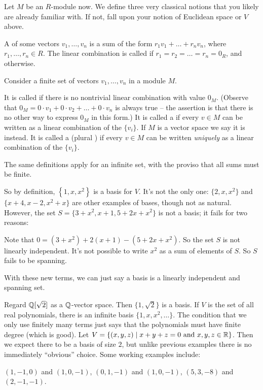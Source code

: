 Let $M$ be an $R$-module now.
We define three very classical notions that you likely are already familiar with.
If not, fall upon your notion of Euclidean space or $V$ above.
\begin{definition}
	A  of some vectors $v_1, \dots, v_n$
	is a sum of the form $r_1 v_1 + \dots + r_n v_n$,
	where $r_1, \dots, r_n \in R$.
	The linear combination is called 
	if $r_1 = r_2 = \dots = r_n = 0_R$, and  otherwise.
\end{definition}
\begin{definition}
	Consider a finite set of vectors $v_1, \dots, v_n$ in a module $M$.
	\begin{itemize}
		\ii It is called  if there
		is no nontrivial linear combination with value $0_M$.
		(Observe that $0_M = 0 \cdot v_1 + 0 \cdot v_2 + \dots + 0 \cdot v_n$
		is always true -- the assertion is that there is no other
		way to express $0_M$ in this form.)
		\ii It is called a  if every $v \in M$ can be written as
		a linear combination of the $\{v_i\}$.
		If $M$ is a vector space we say it is  instead.
		\ii It is called a  (plural )
		if every $v \in M$ can be written
		\emph{uniquely} as a linear combination of the $\{v_i\}$.
	\end{itemize}
	The same definitions apply for an infinite set, with the proviso
	that all sums must be finite.

\end{definition}
So by definition, $\left\{ 1,x,x^2 \right\}$ is a basis for $V$.
It's not the only one: $\{2, x, x^2\}$ and $\{x+4, x-2, x^2+x\}$
are other examples of bases, though not as natural.
However, the set $S = \{3+x^2, x+1, 5+2x+x^2\}$ is not a basis;
it fails for two reasons:
\begin{itemize}
	\ii Note that
	$0 = (3+x^2) + 2(x+1) - (5+2x+x^2)$.
	So the set $S$ is not linearly independent.
	\ii It's not possible to write $x^2$ as a sum of elements of $S$.
	So $S$ fails to be spanning.
\end{itemize}
With these new terms, we can just say a basis is a linearly independent and spanning set.

\begin{example}
	\listhack
	\begin{enumerate}[(a)]
		\ii Regard $\mathbb Q[\sqrt2]$ as a $\mathbb Q$-vector space. Then $\{1, \sqrt 2\}$ is a basis.
		\ii If $V$ is the set of all real polynomials, there is an infinite basis $\{1, x, x^2, \dots\}$.
		The condition that we only use finitely many terms just says
		that the polynomials must have finite degree (which is good).
		\ii Let $V = \{ (x,y,z) \mid x+y+z=0 \text{ and } x,y,z \in \mathbb R\}$.
		Then we expect there to be a basis of size $2$, but unlike previous examples
		there is no immediately ``obvious'' choice.
		Some working examples include:
		\begin{itemize}
			\ii $(1,-1,0)$ and $(1,0,-1)$,
			\ii $(0,1,-1)$ and $(1,0,-1)$,
			\ii $(5,3,-8)$ and $(2,-1,-1)$.
		\end{itemize}
	\end{enumerate}
\end{example}

